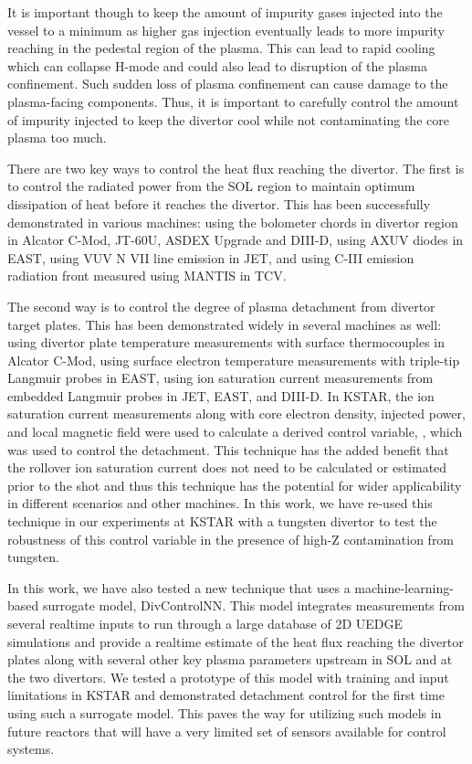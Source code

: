 It is important though to keep the amount of impurity gases injected into the vessel to a minimum as higher gas injection eventually leads to more impurity reaching in the pedestal region of the plasma.
This can lead to rapid cooling which can collapse H-mode and could also lead to disruption of the plasma confinement.
Such sudden loss of plasma confinement can cause damage to the plasma-facing components.
Thus, it is important to carefully control the amount of impurity injected to keep the divertor cool while not contaminating the core plasma too much.

There are two key ways to control the heat flux reaching the divertor.
The first is to control the radiated power from the \ac{SOL} region to maintain optimum dissipation of heat before it reaches the divertor.
This has been successfully demonstrated in various machines:
using the bolometer chords in divertor region in Alcator C-Mod\cite{Goetz_1999_POP}, JT-60U\cite{Asakura_2009_NF}, ASDEX Upgrade\cite{Kallenbach_2012_NF} and DIII-D\cite{Eldon_2019_NME},
using AXUV diodes in EAST\cite{Wu_2018_NF},
using VUV N VII line emission in JET\cite{Maddison_2011_NF}, and
using C-III emission radiation front measured using MANTIS in TCV\cite{Ravensbergen_2021_NC}.

The second way is to control the degree of plasma detachment from divertor target plates.
This has been demonstrated widely in several machines as well:
using divertor plate temperature measurements with surface thermocouples in Alcator C-Mod\cite{Brunner_2017_NF},
using surface electron temperature measurements with triple-tip Langmuir probes in EAST\cite{Eldon_2021_NME},
using ion saturation current measurements from embedded Langmuir probes in JET\cite{Guillemaut_2017_PPCF}, EAST\cite{Yuan_2020_FED}, and DIII-D\cite{Eldon_2021_NME}.
In KSTAR, the ion saturation current measurements along with core electron density, injected power, and local magnetic field were used to calculate a derived control variable, \Afrac, which was used to control the detachment\cite{Eldon_2022_PPCF}.
This technique has the added benefit that the rollover ion saturation current does not need to be calculated or estimated prior to the shot and thus this technique has the potential for wider applicability in different scenarios and other machines.
In this work, we have re-used this technique in our experiments at KSTAR with a tungsten divertor to test the robustness of this control variable in the presence of high-Z contamination from tungsten.

In this work, we have also tested a new technique that uses a machine-learning-based surrogate model, DivControlNN\cite{Zhu_2025_InPrep}.
This model integrates measurements from several realtime inputs to run through a large database of 2D UEDGE\cite{Rognlien_1999_PP} simulations and provide a realtime estimate of the heat flux reaching the divertor plates along with several other key plasma parameters upstream in \ac{SOL} and at the two divertors.
We tested a prototype of this model with training and input limitations in KSTAR and demonstrated detachment control for the first time using such a surrogate model.
This paves the way for utilizing such models in future reactors that will have a very limited set of sensors available for control systems.

